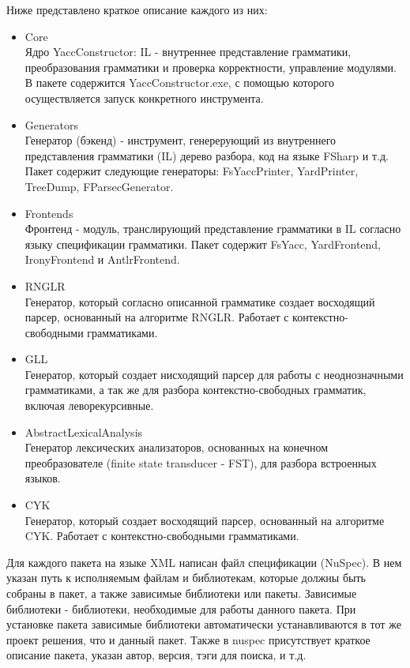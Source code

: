 \documentclass{matmex-diploma-custom}
\begin{document}
Ниже представлено краткое описание каждого из них:
\begin{itemize}
\item Core\\
Ядро YaccConstructor: IL - внутреннее представление грамматики, преобразования грамматики и проверка корректности, управление модулями. В пакете содержится YaccConstructor.exe, с помощью которого осуществляется запуск конкретного инструмента.
\item Generators\\
Генератор (бэкенд) - инструмент, генерерующий из внутреннего представления грамматики (IL) дерево разбора, код на языке FSharp и т.д. Пакет содержит следующие генераторы: FsYaccPrinter, YardPrinter, TreeDump, FParsecGenerator. 
\item Frontends\\
Фронтенд - модуль, транслирующий представление грамматики в IL согласно языку спецификации грамматики. Пакет содержит FsYacc, YardFrontend, IronyFrontend и AntlrFrontend. 
\item RNGLR\\
Генератор, который согласно описанной грамматике создает восходящий парсер, основанный на алгоритме RNGLR. Работает с контекстно-свободными грамматиками.
\item GLL\\
Генератор, который создает нисходящий парсер для работы с неоднозначными грамматиками, а так же для разбора контекстно-свободных грамматик, включая леворекурсивные. 
\item AbstractLexicalAnalysis\\
Генератор лексических анализаторов, основанных на  конечном преобразователе (finite state transducer - FST), для разбора встроенных языков. 
\item CYK\\
Генератор, который создает восходящий парсер, основанный на алгоритме CYK. Работает с контекстно-свободными грамматиками.
\end{itemize}

Для каждого пакета на языке XML написан файл спецификации (NuSpec). В нем указан путь к исполняемым файлам и библиотекам, которые должны быть собраны в пакет, а также зависимые библиотеки или пакеты. Зависимые библиотеки - библиотеки, необходимые для работы данного пакета. При установке пакета зависимые библиотеки автоматически устанавливаются в тот же проект решения, что и данный пакет. Также в nuspec присутствует краткое описание пакета, указан автор, версия, тэги для поиска, и т.д.
\end{document}
